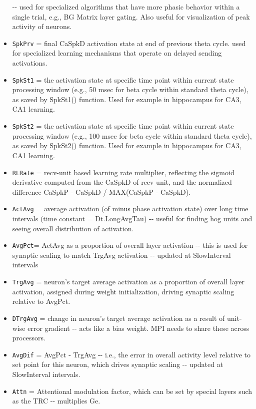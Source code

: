 \documentclass[11pt,twoside]{article}
\newif\myifpdf
\begin{document}
\begin{itemize}
  -\/- used for specialized algorithms that have more phasic behavior
  within a single trial, e.g., BG Matrix layer gating. Also useful for
  visualization of peak activity of neurons.
\item
  \texttt{SpkPrv} = final CaSpkD activation state at end of previous
  theta cycle. used for specialized learning mechanisms that operate on
  delayed sending activations.
\item
  \texttt{SpkSt1} = the activation state at specific time point within
  current state processing window (e.g., 50 msec for beta cycle within
  standard theta cycle), as saved by SpkSt1() function. Used for example
  in hippocampus for CA3, CA1 learning.
\item
  \texttt{SpkSt2} = the activation state at specific time point within
  current state processing window (e.g., 100 msec for beta cycle within
  standard theta cycle), as saved by SpkSt2() function. Used for example
  in hippocampus for CA3, CA1 learning.
\item
  \texttt{RLRate} = recv-unit based learning rate multiplier, reflecting
  the sigmoid derivative computed from the CaSpkD of recv unit, and the
  normalized difference CaSpkP - CaSpkD / MAX(CaSpkP - CaSpkD).
\item
  \texttt{ActAvg} = average activation (of minus phase activation state)
  over long time intervals (time constant = Dt.LongAvgTau) -\/- useful
  for finding hog units and seeing overall distribution of activation.
\item
  \texttt{AvgPct}= ActAvg as a proportion of overall layer activation
  -\/- this is used for synaptic scaling to match TrgAvg activation -\/-
  updated at SlowInterval intervals
\item
  \texttt{TrgAvg} = neuron's target average activation as a proportion
  of overall layer activation, assigned during weight initialization,
  driving synaptic scaling relative to AvgPct.
\item
  \texttt{DTrgAvg} = change in neuron's target average activation as a
  result of unit-wise error gradient -\/- acts like a bias weight. MPI
  needs to share these across processors.
\item
  \texttt{AvgDif} = AvgPct - TrgAvg -\/- i.e., the error in overall
  activity level relative to set point for this neuron, which drives
  synaptic scaling -\/- updated at SlowInterval intervals.
\item
  \texttt{Attn} = Attentional modulation factor, which can be set by
  special layers such as the TRC -\/- multiplies Ge.

\end{itemize}
\end{document}
